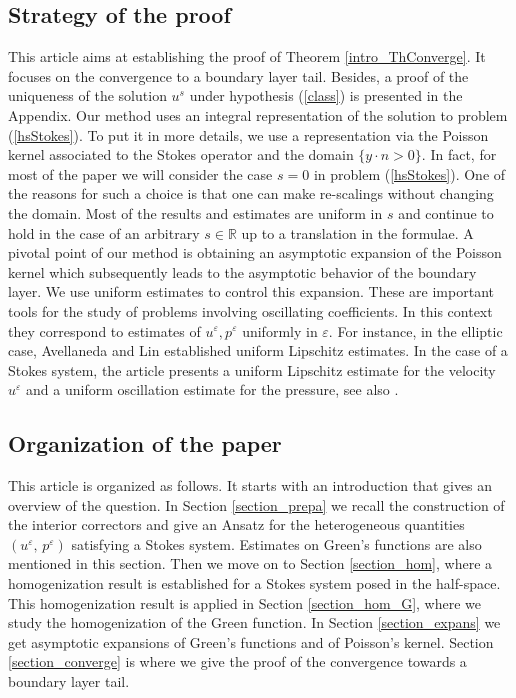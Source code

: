 \documentclass[11pt, reqno]{amsart}
\theoremstyle{definition}
\theoremstyle{remark}
\numberwithin{equation}{section}
\begin{document}
	\subsection{Strategy of the proof}
	
	\noindent This article aims at establishing the proof of Theorem \ref{intro_ThConverge}. It focuses on the convergence to a boundary layer tail. Besides, a proof of the uniqueness of the solution $u^s$ under hypothesis (\ref{class}) is presented in the Appendix. 	Our method uses an integral representation of the solution to problem (\ref{hsStokes}). To put it in more details, we use a representation via the Poisson kernel associated to the Stokes operator and the domain $ \{ y\cdot n>0 \}$. In fact, for most of the paper we will consider the case $s=0$ in problem (\ref{hsStokes}).  One of the reasons for such a choice is that one can make re-scalings without changing the domain. Most of the  results and estimates are uniform in $s$ and continue to hold in the case of an arbitrary $s\in\mathbb{R}$ up to a translation in the formulae. A pivotal point of our method is obtaining  an asymptotic expansion  of the Poisson kernel which subsequently leads to the asymptotic behavior of the boundary layer. We use  uniform estimates to control this expansion.
	These are important tools for the study of  problems involving oscillating coefficients. In this context they correspond to  estimates of $u^\varepsilon, p^\varepsilon$ uniformly in $\varepsilon$. For instance, in the elliptic case, Avellaneda and Lin established uniform Lipschitz estimates. In the case of a Stokes system, the article \cite{GZ} presents a uniform Lipschitz estimate for the velocity $u^\varepsilon$ and a uniform oscillation estimate for the pressure, see also \cite{hom_stokes, optimBoundEstimate, HigPrZhuge}.
	\subsection{Organization of the paper}
	\noindent	This article is organized as follows. It starts with an introduction that gives an overview of the question. In Section \ref{section_prepa} we recall the construction of the interior correctors and give  an Ansatz for the heterogeneous quantities $(u^\varepsilon, \, p^\varepsilon)$ satisfying a Stokes system. Estimates on Green's functions are also mentioned in this section. Then we move on to Section \ref{section_hom}, where a homogenization result is established for a Stokes system posed in the half-space. This homogenization result is applied in Section \ref{section_hom_G}, where we study the homogenization of the Green function. In Section \ref{section_expans} we get  asymptotic expansions of Green's functions and of Poisson's kernel.
	Section \ref{section_converge} is where we give the proof of the convergence towards a boundary layer tail.
\end{document}
